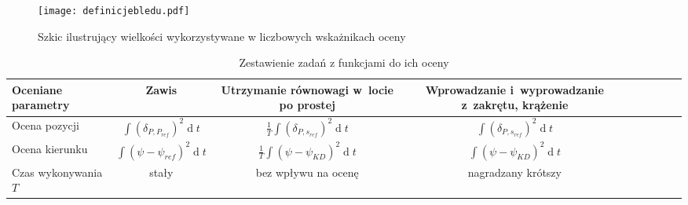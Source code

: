 \begin{figure}[!h]
    \caption{Szkic ilustrujący wielkości wykorzystywane w liczbowych wskażnikach oceny}
    \label{fig:definicjebledu}
    \centering \texttt{[image: definicjebledu.pdf]}
\end{figure}

\begin{table}[!h] \centering
    \caption{Zestawienie zadań z funkcjami do ich oceny}
    \label{tab:ocena-funkcje}
    \renewcommand{\arraystretch}{1.3} %

    \begin{tabular}{| l *{8}{| c} |}
    \hline
    \textbf{Oceniane parametry} &
    Zawis &
    \parbox{10em}{\raggedright Utrzymanie równowagi w~locie po prostej} &
    \parbox{10em}{\raggedright Wprowadzanie i~wyprowadzanie z~zakrętu, krążenie} \\ \hline \hline
    Ocena pozycji & $ \int{(\delta_{P,P_{ref}})^2 \operatorname{d}t} $ & $ \frac{1}{T} \int{(\delta_{P,s_{ref}})^2 \operatorname{d}t} $ & $ \int{(\delta_{P,s_{ref}})^2 \operatorname{d}t} $ \\ \hline
    Ocena kierunku & $ \int{(\psi - \psi_{ref})^2 \operatorname{d}t} $ & $ \frac{1}{T} \int{(\psi - \psi_{KD})^2 \operatorname{d}t} $ & $ \int{(\psi - \psi_{KD})^2 \operatorname{d}t} $ \\ \hline
    Czas wykonywania $ T $ & stały & bez wpływu na ocenę & nagradzany krótszy \\ \hline
  \end{tabular}
\end{table}

